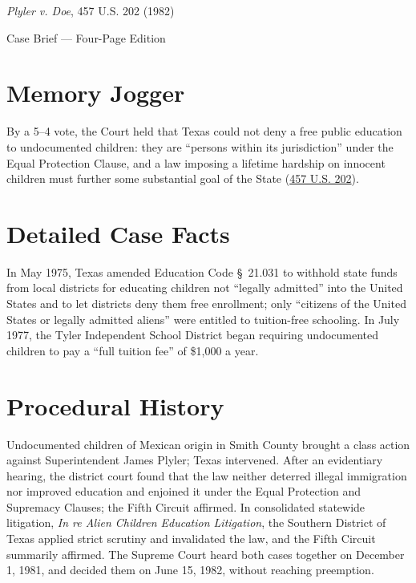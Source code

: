 \documentclass[12pt]{article}
\begin{document}
\begin{center}
{\LARGE \textit{Plyler v. Doe}, 457 U.S. 202 (1982)\par}
\vspace{0.8em}
{\large Case Brief --- Four-Page Edition\par}
\end{center}
\vspace{1em}

\section{Memory Jogger}

By a 5--4 vote, the Court held that Texas could not deny a free public education to undocumented children: they are ``persons within its jurisdiction'' under the Equal Protection Clause, and a law imposing a lifetime hardship on innocent children must further some substantial goal of the State (\href{https://supreme.justia.com/cases/federal/us/457/202/}{457 U.S. 202}).

\section{Detailed Case Facts}

In May 1975, Texas amended Education Code \S~21.031 to withhold state funds from local districts for educating children not ``legally admitted'' into the United States and to let districts deny them free enrollment; only ``citizens of the United States or legally admitted aliens'' were entitled to tuition-free schooling. In July 1977, the Tyler Independent School District began requiring undocumented children to pay a ``full tuition fee'' of \$1,000 a year.

\section{Procedural History}

Undocumented children of Mexican origin in Smith County brought a class action against Superintendent James Plyler; Texas intervened. After an evidentiary hearing, the district court found that the law neither deterred illegal immigration nor improved education and enjoined it under the Equal Protection and Supremacy Clauses; the Fifth Circuit affirmed. In consolidated statewide litigation, \textit{In re Alien Children Education Litigation}, the Southern District of Texas applied strict scrutiny and invalidated the law, and the Fifth Circuit summarily affirmed. The Supreme Court heard both cases together on December 1, 1981, and decided them on June 15, 1982, without reaching preemption.
\end{document}
